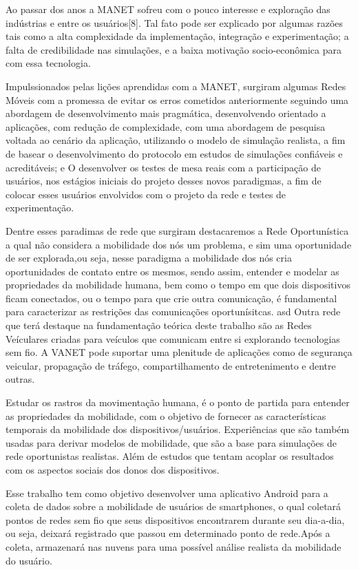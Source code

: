 \documentclass[12pt, %
openright, 
oneside, %
a4paper,    %
brazil]{facom-ufu-abntex2}
\begin{document}
Ao passar dos anos a MANET sofreu  com o pouco interesse e exploração das indústrias e entre os usuários[8]. Tal fato pode ser explicado por algumas razões tais como a alta complexidade da implementação, integração e experimentação; a falta de credibilidade nas simulações, e a baixa motivação socio-econômica para com essa tecnologia.

Impulssionados pelas lições aprendidas com a MANET, surgiram algumas Redes Móveis com a promessa de evitar os erros cometidos anteriormente seguindo uma abordagem de desenvolvimento mais pragmática, desenvolvendo orientado a aplicações, com redução de complexidade, com uma abordagem de pesquisa voltada ao cenário da aplicação, utilizando o modelo de simulação realista, a fim de basear o desenvolvimento do protocolo em estudos de simulações confiáveis e acreditáveis; e O desenvolver os testes de mesa reais com a participação de usuários, nos estágios iniciais do projeto desses novos paradigmas, a fim de colocar esses usuários envolvidos com o projeto da rede e testes de experimentação.\cite{6710069}

Dentre esses paradimas de rede que surgiram destacaremos a Rede Oportunística a qual não considera a mobilidade dos nós um problema, e sim uma oportunidade de ser explorada,ou seja, nesse paradigma a mobilidade dos nós cria oportunidades de contato entre os mesmos, sendo assim, entender e modelar as propriedades da mobilidade humana, bem como o tempo em que dois dispositivos ficam conectados, ou o tempo para que crie outra comunicação, é fundamental para caracterizar as restrições das comunicações oportunísitcas.
asd
Outra rede que terá destaque na fundamentação teórica deste trabalho são as Redes Veículares criadas para veículos que comunicam entre si explorando tecnologias sem fio. A VANET pode suportar uma plenitude de aplicações como de segurança veicular, propagação de tráfego, compartilhamento de entretenimento e dentre outras.

Estudar os rastros da movimentação humana, é o ponto de partida para entender as propriedades da mobilidade, com o objetivo de fornecer as características temporais da mobilidade dos dispositivos/usuários. Experiências que são também usadas para derivar modelos de mobilidade, que são a base para simulações de rede oportunistas realistas. Além de estudos que tentam acoplar os resultados com os aspectos sociais dos donos dos dispositivos. \cite{6838650}

Esse trabalho tem como objetivo desenvolver uma aplicativo Android para a coleta de dados sobre a mobilidade de usuários de smartphones, o qual coletará pontos de redes sem fio que seus dispositivos encontrarem durante seu dia-a-dia, ou seja, deixará registrado que passou em determinado ponto de rede.Após a coleta, armazenará nas nuvens para uma possível análise 
realista da mobilidade do usuário.
\end{document}

